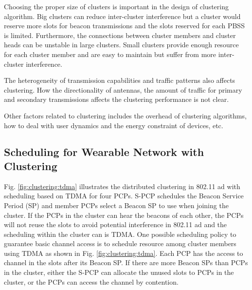 \documentclass[10pt, conference, letterpaper]{IEEEtran}
\begin{document}
Choosing the proper size of clusters is important in the design of clustering algorithm. Big clusters can reduce inter-cluster interference but a cluster would reserve more slots for beacon transmissions and the slots reserved for each PBSS is limited. Furthermore, the connections between cluster members and cluster heads can be unstable in large clusters.
Small clusters provide enough resource for each cluster member and are easy to maintain but suffer from more inter-cluster interference.

The heterogeneity of transmission capabilities and traffic patterns also affects clustering. How the directionality of antennas, the amount of traffic for primary and secondary transmissions affects the clustering performance is not clear. 

Other factors related to clustering includes the overhead of clustering algorithms, how to deal with user dynamics and the energy constraint of devices, etc.


\subsection{Scheduling for Wearable Network with Clustering}\label{section:MAC:scheduling}

Fig. \ref{fig:clustering:tdma} illustrates the distributed clustering in 802.11 ad with scheduling based on TDMA for four PCPs. S-PCP schedules the Beacon Service Period (SP) and member PCPs select a Beacon SP to use when joining the cluster. If the PCPs in the cluster can hear the beacons of each other, the PCPs will not reuse the slots to avoid potential interference in 802.11 ad and the scheduling within the cluster can is TDMA. One possible scheduling policy to guarantee basic channel access is to schedule resource among cluster members using TDMA as shown in Fig.  \ref{fig:clustering:tdma}. Each PCP has the access to channel in the slots after its Beacon SP. If there are more Beacon SPs than PCPs in the cluster, either the S-PCP can allocate the unused slots to PCPs in the cluster, or the PCPs can access the channel by contention.
\end{document}
